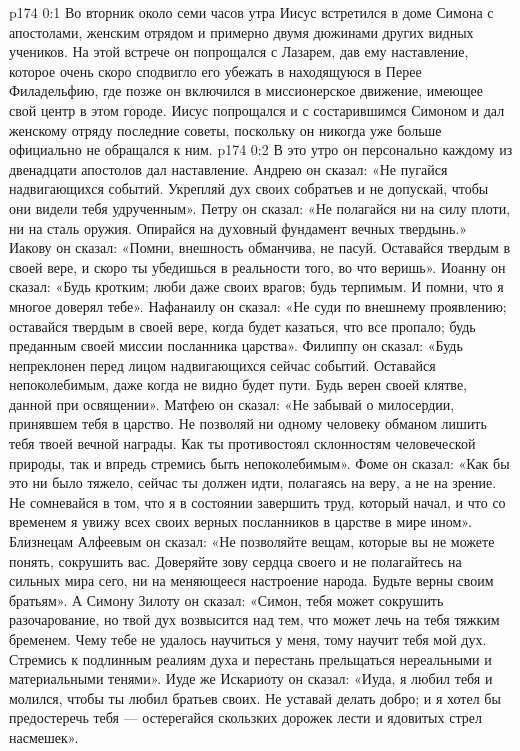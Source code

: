 \author{Комиссия срединников}
\vs p174 0:1 Во вторник около семи часов утра Иисус встретился в доме Симона с апостолами, женским отрядом и примерно двумя дюжинами других видных учеников. На этой встрече он попрощался с Лазарем, дав ему наставление, которое очень скоро сподвигло его убежать в находящуюся в Перее Филадельфию, где позже он включился в миссионерское движение, имеющее свой центр в этом городе. Иисус попрощался и с состарившимся Симоном и дал женскому отряду последние советы, поскольку он никогда уже больше официально не обращался к ним.
\vs p174 0:2 В это утро он персонально каждому из двенадцати апостолов дал наставление. Андрею он сказал: «Не пугайся надвигающихся событий. Укрепляй дух своих собратьев и не допускай, чтобы они видели тебя удрученным». Петру он сказал: «Не полагайся ни на силу плоти, ни на сталь оружия. Опирайся на духовный фундамент вечных твердынь.» Иакову он сказал: «Помни, внешность обманчива, не пасуй. Оставайся твердым в своей вере, и скоро ты убедишься в реальности того, во что веришь». Иоанну он сказал: «Будь кротким; люби даже своих врагов; будь терпимым. И помни, что я многое доверял тебе». Нафанаилу он сказал: «Не суди по внешнему проявлению; оставайся твердым в своей вере, когда будет казаться, что все пропало; будь преданным своей миссии посланника царства». Филиппу он сказал: «Будь непреклонен перед лицом надвигающихся сейчас событий. Оставайся непоколебимым, даже когда не видно будет пути. Будь верен своей клятве, данной при освящении». Матфею он сказал: «Не забывай о милосердии, принявшем тебя в царство. Не позволяй ни одному человеку обманом лишить тебя твоей вечной награды. Как ты противостоял склонностям человеческой природы, так и впредь стремись быть непоколебимым». Фоме он сказал: «Как бы это ни было тяжело, сейчас ты должен идти, полагаясь на веру, а не на зрение. Не сомневайся в том, что я в состоянии завершить труд, который начал, и что со временем я увижу всех своих верных посланников в царстве в мире ином». Близнецам Алфеевым он сказал: «Не позволяйте вещам, которые вы не можете понять, сокрушить вас. Доверяйте зову сердца своего и не полагайтесь на сильных мира сего, ни на меняющееся настроение народа. Будьте верны своим братьям». А Симону Зилоту он сказал: «Симон, тебя может сокрушить разочарование, но твой дух возвысится над тем, что может лечь на тебя тяжким бременем. Чему тебе не удалось научиться у меня, тому научит тебя мой дух. Стремись к подлинным реалиям духа и перестань прельщаться нереальными и материальными тенями». Иуде же Искариоту он сказал: «Иуда, я любил тебя и молился, чтобы ты любил братьев своих. Не уставай делать добро; и я хотел бы предостеречь тебя --- остерегайся скользких дорожек лести и ядовитых стрел насмешек».
